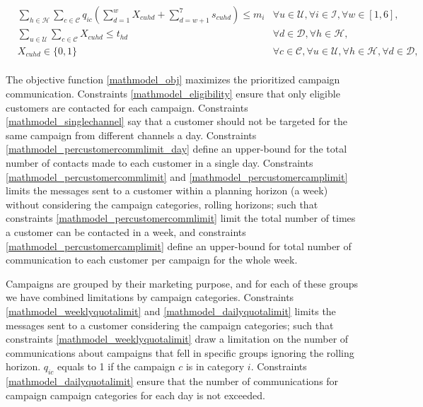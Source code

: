 \documentclass[11pt]{article}
\begin{document}
\begin{align}
&\sum\limits_{h\in\mathcal{H}}\sum\limits_{c\in\mathcal{C}}q_{{i}{c}}\left(\sum_{d=1}^{w}X_{{c}{u}{h}{d}} + \sum_{d=w+1}^{7}s_{{c}{u}{h}{d}}\right) \leq m_{i} &\forall u \in \mathcal{U}, \forall i \in \mathcal{I}, \forall w \in [1,6], \label{mathmodel_weeklyquotalimit_rh}&\\
&\sum\limits_{u\in\mathcal{U}}\sum\limits_{c\in\mathcal{C}}X_{{c}{u}{h}{d}} \leq t_{{h}{d}} &\forall d \in \mathcal{D}, \forall h \in \mathcal{H}, \label{mathmodel_channellimit}&\\
&X_{{c}{u}{h}{d}} \in \{0,1\}&\forall c \in \mathcal{C}, \forall u \in \mathcal{U}, \forall h \in \mathcal{H}, \forall d \in \mathcal{D}, \label{mathmodel_integrity}
\end{align}\\
The objective function \eqref{mathmodel_obj} maximizes the prioritized campaign communication. Constraints \eqref{mathmodel_eligibility} ensure that only eligible customers are contacted for each campaign. Constraints \eqref{mathmodel_singlechannel} say that a customer should not be targeted for the same campaign from different channels a day. Constraints \eqref{mathmodel_percustomercommlimit_day} define an upper-bound for the total number of contacts made to each customer in a single day. Constraints \eqref{mathmodel_percustomercommlimit} and \eqref{mathmodel_percustomercamplimit} limits the messages sent to a customer within a planning horizon (a week) without considering the campaign categories, rolling horizons; such that constraints \eqref{mathmodel_percustomercommlimit} limit the total number of times a customer can be contacted in a week, and constraints \eqref{mathmodel_percustomercamplimit} define an upper-bound for total number of communication to each customer per campaign for the whole week.

Campaigns are grouped by their marketing purpose, and for each of these groups we have combined limitations by campaign categories. Constraints \eqref{mathmodel_weeklyquotalimit} and \eqref{mathmodel_dailyquotalimit} limits the messages sent to a customer considering the campaign categories; such that constraints \eqref{mathmodel_weeklyquotalimit} draw a limitation on the number of communications about campaigns that fell in specific groups ignoring the rolling horizon. $q_{{i}{c}}$ equals to 1 if the campaign $c$ is in category $i$. Constraints \eqref{mathmodel_dailyquotalimit} ensure that the number of communications for campaign campaign categories for each day is not exceeded.
\end{document}
